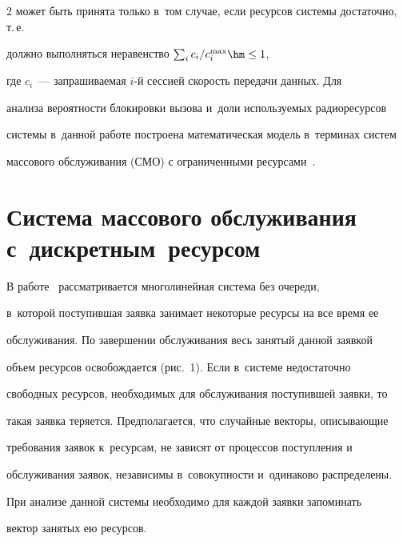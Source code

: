 \begin{multicols}{2}
может быть принята только в~том случае, если ресурсов системы достаточно, т.\,е.\ 

должно выполняться неравенство $\sum\nolimits_i c_i/c_i^{\max}\hm\leq 1$, 

где $c_i$~--- запрашиваемая $i$-й сессией скорость передачи данных. Для 

анализа вероятности блокировки вызова и~доли используемых радиоресурсов 

системы в~данной работе построена математическая модель в~терминах систем 

массового обслуживания (СМО) с ограниченными ресурсами~\cite{5-v}.



\vspace*{-6pt}



\section{Система массового обслуживания с~дискретным~ресурсом}



\vspace*{-2pt}

    

  В работе~\cite{2-v} рассматривается многолинейная сис\-те\-ма без очереди, 

  в~которой поступившая заявка занимает некоторые ресурсы на все время ее 

обслуживания. По завершении обслуживания весь занятый данной заявкой 

объем ресурсов осво\-бож\-да\-ет\-ся (рис.~1). Если в~системе недостаточно 

свободных ресурсов, необходимых для обслуживания поступившей заявки, то 

такая заявка теряется. Предполагается, что случайные векторы, описывающие 

требования заявок к~ресурсам, не зависят от процессов поступления и~

обслуживания заявок, независимы в~совокупности и~одинаково распределены. 

При анализе данной системы необходимо для каждой заявки запоминать 

вектор занятых ею ресурсов. 

  \begin{figure} %

           \vspace*{1pt}


\end{figure}
\end{multicols}

